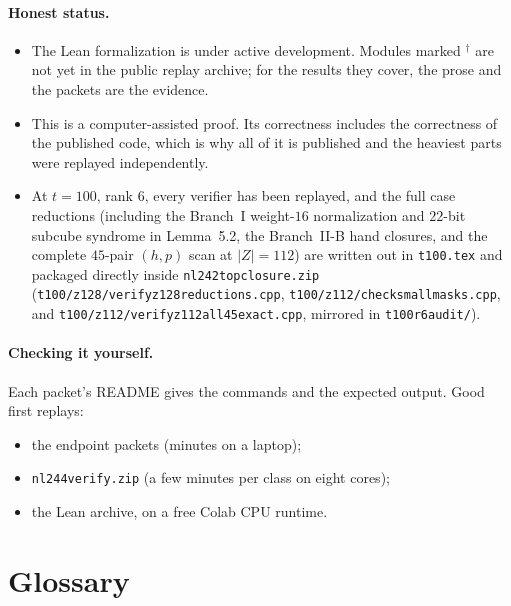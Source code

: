 \documentclass[11pt]{article}
\theoremstyle{definition}
\theoremstyle{remark}
\newcommand{\code}[1]{\texttt{#1}}
\DeclareRobustCommand{\_}{\textunderscore\allowbreak}
\begin{document}
\paragraph{Honest status.}
\begin{itemize}[nosep]
  \item The Lean formalization is under active development. Modules marked $^\dagger$ are not yet in the public replay archive; for the results they cover, the prose and the packets are the evidence.
  \item This is a computer-assisted proof. Its correctness includes the correctness of the published code, which is why all of it is published and the heaviest parts were replayed independently.
  \item At $t=100$, rank $6$, every verifier has been replayed, and the full case reductions (including the Branch~I weight-$16$ normalization and $22$-bit subcube syndrome in Lemma~5.2, the Branch~II-B hand closures, and the complete $45$-pair $(h,p)$ scan at $|Z|=112$) are written out in \code{t100.tex} and packaged directly inside \code{nl242\_top\_closure.zip} (\code{t100/z128/verify\_z128\_reductions.cpp}, \code{t100/z112/check\_small\_masks.cpp}, and \code{t100/z112/verify\_z112\_all45\_exact.cpp}, mirrored in \code{t100\_r6\_audit/}).
\end{itemize}

\paragraph{Checking it yourself.} Each packet's README gives the commands and the expected output. Good first replays:
\begin{itemize}[nosep]
  \item the endpoint packets (minutes on a laptop);
  \item \code{nl244\_verify.zip} (a few minutes per class on eight cores);
  \item the Lean archive, on a free Colab CPU runtime.
\end{itemize}

\appendix
\section{Glossary}
\end{document}
